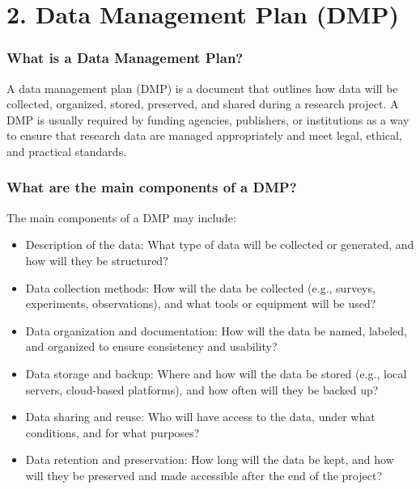 \documentclass[
  letterpaper,
  DIV=11,
  numbers=noendperiod]{scrreprt}
\begin{document}

\hypertarget{data-management-plan-dmp}{%
\chapter*{2. Data Management Plan
(DMP)}\label{data-management-plan-dmp}}


\hypertarget{what-is-a-data-management-plan}{%
\subsection*{\texorpdfstring{\textbf{What is a Data Management
Plan?}}{What is a Data Management Plan?}}\label{what-is-a-data-management-plan}}

A data management plan (DMP) is a document that outlines how data will
be collected, organized, stored, preserved, and shared during a research
project. A DMP is usually required by funding agencies, publishers, or
institutions as a way to ensure that research data are managed
appropriately and meet legal, ethical, and practical standards.

\hypertarget{what-are-the-main-components-of-a-dmp}{%
\subsection*{\texorpdfstring{\textbf{What are the main components of a
DMP?}}{What are the main components of a DMP?}}\label{what-are-the-main-components-of-a-dmp}}

The main components of a DMP may include:

\begin{itemize}
\item
  Description of the data: What type of data will be collected or
  generated, and how will they be structured?
\item
  Data collection methods: How will the data be collected (e.g.,
  surveys, experiments, observations), and what tools or equipment will
  be used?
\item
  Data organization and documentation: How will the data be named,
  labeled, and organized to ensure consistency and usability?
\item
  Data storage and backup: Where and how will the data be stored (e.g.,
  local servers, cloud-based platforms), and how often will they be
  backed up?
\item
  Data sharing and reuse: Who will have access to the data, under what
  conditions, and for what purposes?
\item
  Data retention and preservation: How long will the data be kept, and
  how will they be preserved and made accessible after the end of the
  project?
\end{itemize}
\end{document}
